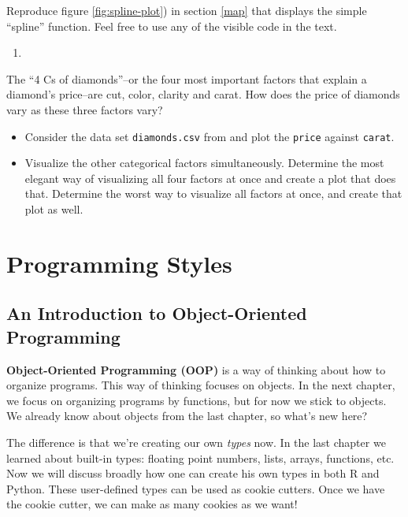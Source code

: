 \documentclass[12pt,krantz2]{krantz}
\providecommand{\tightlist}{%
  \setlength{\itemsep}{0pt}\setlength{\parskip}{0pt}}
\begin{document}
Reproduce figure \ref{fig:spline-plot}) in section \ref{map} that displays the simple ``spline'' function. Feel free to use any of the visible code in the text.

\begin{enumerate}
\def\labelenumi{\arabic{enumi}.}
\setcounter{enumi}{1}
\item
\end{enumerate}

The ``4 Cs of diamonds''--or the four most important factors that explain a diamond's price--are cut, color, clarity and carat. How does the price of diamonds vary as these three factors vary?

\begin{itemize}
\tightlist
\item
  Consider the data set \texttt{diamonds.csv} from \citep{ggplot2} and plot the \texttt{price} against \texttt{carat}.
\item
  Visualize the other categorical factors simultaneously. Determine the most elegant way of visualizing all four factors at once and create a plot that does that. Determine the worst way to visualize all factors at once, and create that plot as well.
\end{itemize}

\hypertarget{part-programming-styles}{%
\part{Programming Styles}\label{part-programming-styles}}

\hypertarget{an-introduction-to-object-oriented-programming}{%
\chapter{An Introduction to Object-Oriented Programming}\label{an-introduction-to-object-oriented-programming}}

\textbf{Object-Oriented Programming (OOP)} is a way of thinking about how to organize programs. This way of thinking focuses on objects. In the next chapter, we focus on organizing programs by functions, but for now we stick to objects. We already know about objects from the last chapter, so what's new here?

The difference is that we're creating our own \emph{types} now. In the last chapter we learned about built-in types: floating point numbers, lists, arrays, functions, etc. Now we will discuss broadly how one can create his own types in both R and Python. These user-defined types can be used as cookie cutters. Once we have the cookie cutter, we can make as many cookies as we want!
\end{document}
